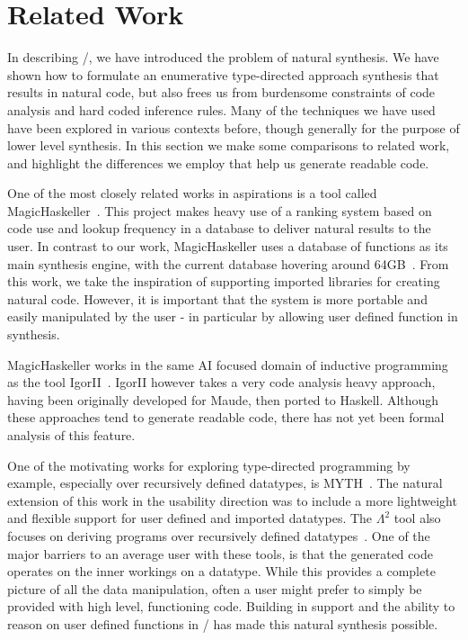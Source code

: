 \section{Related Work}
\label{sec:related}

In describing \ourTool/, we have introduced the problem of natural synthesis. 
We have shown how to formulate an enumerative type-directed approach synthesis that results in natural code, but also frees us from burdensome constraints of code analysis and hard coded inference rules.
Many of the techniques we have used have been explored in various contexts before, though generally for the purpose of lower level synthesis. 
In this section we make some comparisons to related work, and highlight the differences we employ that help us generate readable code.

One of the most closely related works in aspirations is a tool called MagicHaskeller~\cite{DBLP:conf/aaip/Katayama09}. This project makes heavy use of a ranking system based on code use and lookup frequency in a database to deliver natural results to the user. In contrast to our work, MagicHaskeller uses a database of functions as its main synthesis engine, with the current database hovering around
64GB~\cite{DBLP:conf/agi/Katayama15}. From this work, we take the inspiration of supporting imported libraries for creating natural code. However, it is important that the system is more portable and easily manipulated by the user - in particular by allowing user defined function in synthesis.

MagicHaskeller works in the same AI focused domain of inductive programming as the tool IgorII~\cite{DBLP:conf/aaip/HofmannKS09}. IgorII however takes a very code analysis heavy approach, having been originally developed for Maude, then ported to Haskell. Although these approaches tend to generate readable code, there has not yet been formal analysis of this feature.

One of the motivating works for exploring type-directed programming by example, especially over recursively defined datatypes, is MYTH~\cite{Osera:2015, Osera:2016}. The natural extension of this work in the usability direction was to include a more lightweight and flexible support for user defined and imported datatypes. The $\Lambda^2$ tool also focuses on deriving programs over recursively defined datatypes~\cite{Feser:2015}. One of the major barriers to an average user with these tools, is that the generated code operates on the inner workings on a datatype. While this provides a complete picture of all the data manipulation, often a user might prefer to simply be provided with high level, functioning code. Building in support and the ability to reason on user defined functions in \ourTool/ has made this natural synthesis possible.

